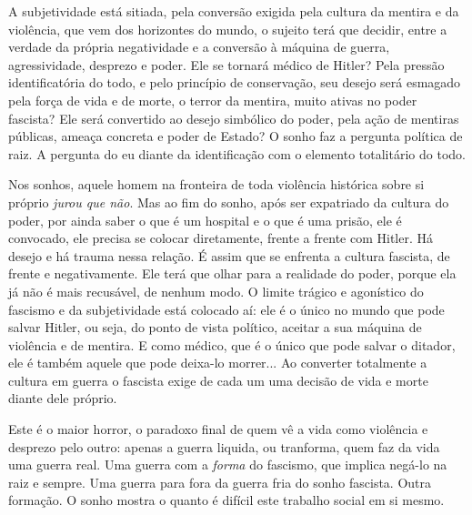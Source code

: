 A subjetividade está sitiada, pela conversão exigida pela cultura da
mentira e da violência, que vem dos horizontes do mundo, o sujeito terá
que decidir, entre a verdade da própria negatividade e a conversão à
máquina de guerra, agressividade, desprezo e poder. Ele se tornará
médico de Hitler? Pela pressão identificatória do todo, e pelo princípio
de conservação, seu desejo será esmagado pela força de vida e de morte,
o terror da mentira, muito ativas no poder fascista? Ele será convertido
ao desejo simbólico do poder, pela ação de mentiras públicas, ameaça
concreta e poder de Estado? O sonho faz a pergunta política de raiz. A
pergunta do eu diante da identificação com o elemento totalitário do
todo.

Nos sonhos, aquele homem na fronteira de toda violência histórica sobre
si próprio \emph{jurou que não}. Mas ao fim do sonho, após ser
expatriado da cultura do poder, por ainda saber o que é um hospital e o
que é uma prisão, ele é convocado, ele precisa se colocar diretamente,
frente a frente com Hitler. Há desejo e há trauma nessa relação. É assim
que se enfrenta a cultura fascista, de frente e negativamente. Ele terá
que olhar para a realidade do poder, porque ela já não é mais recusável,
de nenhum modo. O limite trágico e agonístico do fascismo e da
subjetividade está colocado aí: ele é o único no mundo que pode salvar
Hitler, ou seja, do ponto de vista político, aceitar a sua máquina de
violência e de mentira. E como médico, que é o único que pode salvar o
ditador, ele é também aquele que pode deixa-lo morrer... Ao converter
totalmente a cultura em guerra o fascista exige de cada um uma decisão
de vida e morte diante dele próprio.

Este é o maior horror, o paradoxo final de quem vê a vida como violência
e desprezo pelo outro: apenas a guerra liquida, ou tranforma, quem faz
da vida uma guerra real. Uma guerra com a \emph{forma} do fascismo, que
implica negá-lo na raiz e sempre. Uma guerra para fora da guerra fria do
sonho fascista. Outra formação. O sonho mostra o quanto é difícil este
trabalho social em si mesmo.

